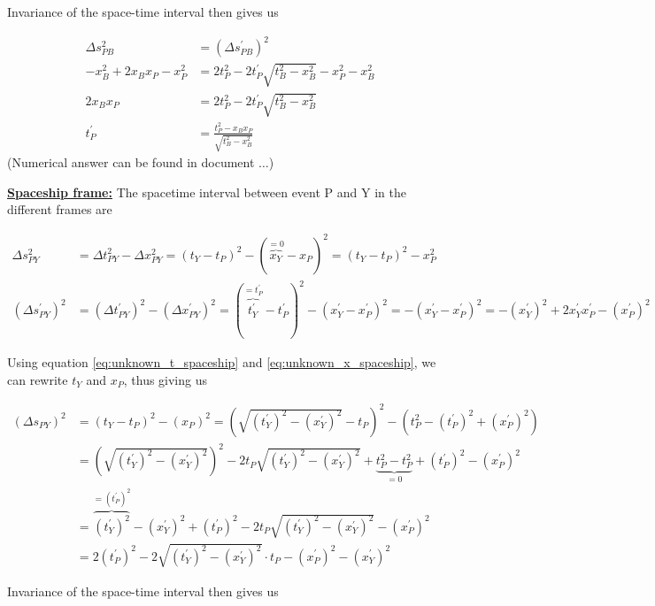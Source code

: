 \documentclass[a4paper,10pt,english]{article}
\begin{document}
\begin{enumerate}
\begin{enumerate}
Invariance of the space-time interval then gives us

\begin{align}
\Delta s_{PB}^2&=(\Delta s_{PB}^{\prime})^2 \nonumber\\
-x_{B}^2+2x_{B}x_{P}-x_{P}^2&=2t_{P}^{2}-2t^{\prime}_{P}\sqrt{t_{B}^2-x_{B}^2}-x_{P}^{2}-x_{B}^2 \nonumber\\
2x_{B}x_{P}&=2t_{P}^{2}-2t^{\prime}_{P}\sqrt{t_{B}^2-x_{B}^2} \nonumber\\
t^{\prime}_{P}&=\frac{t_{P}^{2}-x_{B}x_{P}}{\sqrt{t_{B}^2-x_{B}^2}} \label{eq:t_prime_p}
\end{align}
(Numerical answer can be found in document $\ldots$)

\underline{\bf{Spaceship frame:}} The spacetime interval between event P and Y in the different frames are

\begin{align*}
\Delta s_{PY}^2&=\Delta t_{PY}^2-\Delta x_{PY}^2=(t_{Y}-t_{P})^2-(\overbrace{x_{Y}}^{=0}-x_{P})^2=(t_{Y}-t_{P})^2-x_{P}^2\\
(\Delta s_{PY}^{\prime})^2&=(\Delta t_{PY}^{\prime})^2-(\Delta x_{PY}^{\prime})^2=(\overbrace{t_{Y}^{\prime}}^{=t^{\prime}_{P}}-t^{\prime}_{P})^2-(x_{Y}^{\prime}-x^{\prime}_{P})^2=-(x_{Y}^{\prime}-x^{\prime}_{P})^2=-(x_{Y}^{\prime})^2+2x_{Y}^{\prime}x^{\prime}_{P}-(x^{\prime}_{P})^2
\end{align*}

Using equation \ref{eq:unknown_t_spaceship} and \ref{eq:unknown_x_spaceship}, we can rewrite $t_{Y}$ and $x_{P}$, thus giving us 

\begin{align*}
(\Delta s_{PY})^2&=(t_{Y}-t_{P})^2-(x_{P})^2=\left(\sqrt{(t_{Y}^{\prime})^2-(x_{Y}^{\prime})^2}-t_{P}\right)^2-\left(t_{P}^{2}-(t_{P}^{\prime})^{2}+(x_{P}^{\prime})^{2}\right)\\
&=\left(\sqrt{(t_{Y}^{\prime})^2-(x_{Y}^{\prime})^2}\right)^2-2t_{P}\sqrt{(t_{Y}^{\prime})^2-(x_{Y}^{\prime})^2}+\underbrace{t_{P}^2-t_{P}^{2}}_{=0}+(t_{P}^{\prime})^{2}-(x_{P}^{\prime})^{2}\\
&=\overbrace{(t_{Y}^{\prime})^2}^{=(t_{P}^{\prime})^2}-(x_{Y}^{\prime})^2+(t_{P}^{\prime})^{2}-2t_{P}\sqrt{(t_{Y}^{\prime})^2-(x_{Y}^{\prime})^2}-(x_{P}^{\prime})^{2}\\
&=2(t_{P}^{\prime})^{2}-2\sqrt{(t_{Y}^{\prime})^2-(x_{Y}^{\prime})^2}\cdot t_{P}-(x_{P}^{\prime})^{2}-(x_{Y}^{\prime})^2
\end{align*}

Invariance of the space-time interval then gives us


\end{enumerate}
\end{enumerate}
\end{document}

